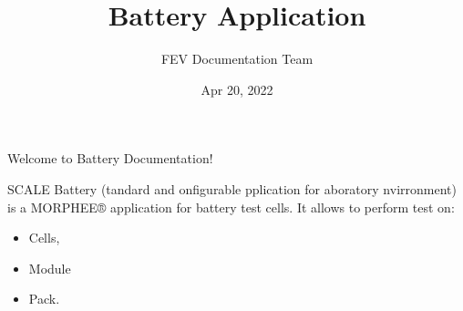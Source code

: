 \documentclass[letterpaper,10pt,english]{jupyterBook}
\title{Battery Application}
\date{Apr 20, 2022}
\author{FEV Documentation Team}
\begin{document}
\pagestyle{empty}
\sphinxmaketitle
\pagestyle{plain}
\sphinxtableofcontents
\pagestyle{normal}
\label{\detokenize{index::doc}}


\sphinxAtStartPar
Welcome to  Battery Documentation!
\begin{quote}

\sphinxAtStartPar
{}
\end{quote}

\sphinxAtStartPar
SCALE Battery (tandard and onfigurable pplication for aboratory nvirronment) is a MORPHEE® application for battery test cells. It allows to perform test on:
\begin{itemize}
\item {} 
\sphinxAtStartPar
Cells,

\item {} 
\sphinxAtStartPar
Module

\item {} 
\sphinxAtStartPar
Pack.

\end{itemize}
\end{document}
